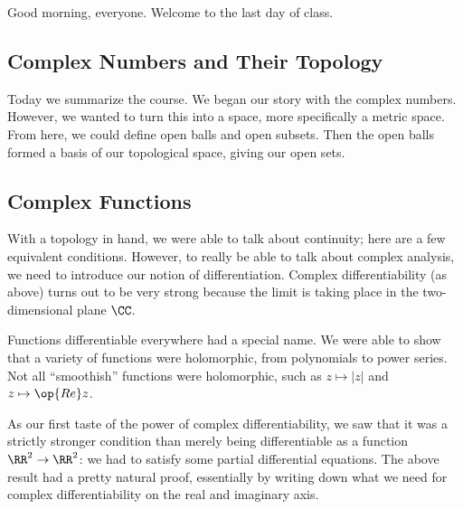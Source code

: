 \documentclass[../notes.tex]{subfiles}
\begin{document}

Good morning, everyone. Welcome to the last day of class.

\subsection{Complex Numbers and Their Topology}
Today we summarize the course. We began our story with the complex numbers.
\complexdefiagain*
\noindent However, we wanted to turn this into a space, more specifically a metric space.
\complexdistdefi*
\noindent From here, we could define open balls and open subsets.
\openballdefi*
\noindent Then the open balls formed a basis of our topological space, giving our open sets.
\opendefi*

\subsection{Complex Functions}
With a topology in hand, we were able to talk about continuity; here are a few equivalent conditions.
\continuitygrabbag*
\noindent However, to really be able to talk about complex analysis, we need to introduce our notion of differentiation.
\complexdiffdefi*
\noindent Complex differentiability (as above) turns out to be very strong because the limit is taking place in the two-dimensional plane $\CC$.

Functions differentiable everywhere had a special name.
\holodefi*
\noindent We were able to show that a variety of functions were holomorphic, from polynomials to power series. Not all ``smoothish'' functions were holomorphic, such as $z\mapsto|z|$ and $z\mapsto\op{Re}z$.

As our first taste of the power of complex differentiability, we saw that it was a strictly stronger condition than merely being differentiable as a function $\RR^2\to\RR^2$: we had to satisfy some partial differential equations.
\cauchyriemannnecessary*
\noindent The above result had a pretty natural proof, essentially by writing down what we need for complex differentiability on the real and imaginary axis.
\end{document}
